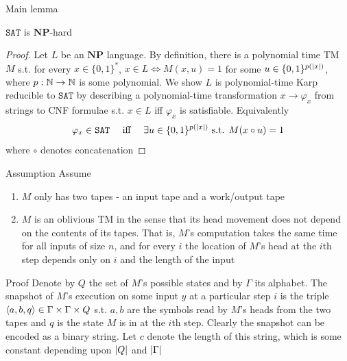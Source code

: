 \documentclass[presentation]{beamer}
\def \NP {\textbf{NP}}
\def \NP {\textbf{NP}}
\def \SAT {\texttt{SAT}}
\begin{document}
\begin{frame}[label={sec:org47a9003}]{Main lemma}
\begin{lemma}[]
\(\SAT\) is \(\NP\)-hard
\end{lemma}

\begin{proof}
Let \(L\) be an \(\NP\) language. By definition, there is a polynomial time TM \(M\) s.t. for
every \(x\in\{0,1\}^*\), \(x\in L\Leftrightarrow M(x,u)=1\) for
some \(u\in\{0,1\}^{p(\abs{x})}\), where \(p:\mathbb{N}\to\mathbb{N}\) is some polynomial. We show \(L\) is
polynomial-time Karp reducible to \(\SAT\) by describing a \alert{polynomial-time
transformation} \(x\to\varphi_x\) from strings to CNF formulae s.t. \(x\in L\) iff \(\varphi_x\)
is satisfiable. Equivalently
     \begin{equation*}
\varphi_x\in\SAT \quad\text{ iff }\quad\exists u\in\{0,1\}^{p(\abs{x})}
\text{ s.t. }M(x\circ u)=1
     \end{equation*}
where \(\circ\) denotes concatenation
\end{proof}
\end{frame}
\begin{frame}[label={sec:org6486699}]{Assumption}
Assume
\begin{enumerate}
\item \(M\) only has two tapes - an input tape and a work/output tape
\item \(M\) is an oblivious TM in the sense that its head movement does not depend on the contents
of its tapes. That is, \(M\)'s computation takes the same time for all inputs of size \(n\),
and for every \(i\) the location of \(M\)'s head at the \(i\)th step depends only on \(i\)
and the length of the input
\end{enumerate}
\end{frame}
\begin{frame}[label={sec:orgcd92e9f}]{Proof}
Denote by \(Q\) the set of \(M\)'s possible states and by \(\Gamma\) its alphabet. The \alert{snapshot}
of \(M\)'s execution on some input \(y\) at a particular step \(i\) is the triple
\(\langle a,b,q\rangle\in\Gamma\times\Gamma\times Q\) s.t. \(a,b\) are the symbols read by \(M\)'s
heads from the two tapes and \(q\) is the state \(M\) is in at the \(i\)th step. Clearly the
snapshot can be encoded as a binary string. Let \(c\) denote the length of this string, which
is some constant depending upon \(\abs{Q}\) and \(\abs{\Gamma}\)
\end{frame}
\end{document}
